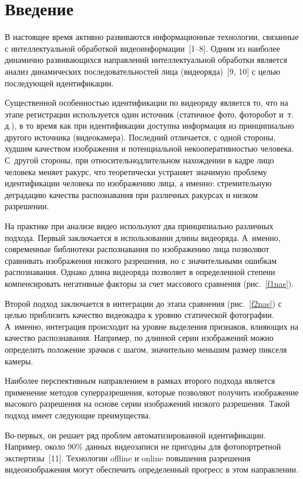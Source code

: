       \begin{multicols}{2}

      \label{st\stat}


     \section{Введение}

     В настоящее время активно развиваются информационные технологии, связанные
с интеллектуальной обработкой видеоинформации~[1--8]. Одним из наиболее
динамично развивающихся\linebreak
на\-прав\-ле\-ний интеллектуальной обработки является анализ
динамических последовательностей лица (видеоряда)~[9, 10] с целью последующей
идентификации.

     Существенной особенностью идентификации по видеоряду является то, что на
этапе регистрации используется один источник (статичное фото, фоторобот и~т.\,д.), в
то время как при идентифи\-кации доступна информация из принципиально другого\linebreak
источника (видеокамера). Последний отличается, с одной стороны, худшим качеством
изоб\-ра\-же\-ния и потенциальной некооперативностью человека. С~другой стороны, при
относительно\linebreak длительном нахождении в кадре лицо человека меняет ракурс, что
теоретически устраняет значимую проблему идентификации человека по изображению
лица, а именно: стремительную деградацию качества распознавания при различных
ракурсах и низком разрешении.

     На практике при анализе видео используют два принципиально различных
подхода. Первый заключается в использовании длины видеоряда. А~именно,
современные библиотеки распознавания по изоб\-ра\-же\-нию лица позволяют сравнивать
изображения низкого разрешения, но с значительными ошибкам распознавания.
Однако длина видеоряда позволяет в определенной степени компенсировать
негативные факторы за счет массового сравнения (рис.~\ref{f1nas}).


      Второй подход заключается в интеграции до этапа сравнения (рис.~\ref{f2nas}) с
целью приблизить качество видеокадра к уровню статической фотографии. А~именно,
интеграция происходит на уровне выделения признаков, влияющих на качество
распознавания. Например, по длинной серии изоб\-ра\-же\-ний можно определить
положение зрачков с шагом, значительно меньшим размер пикселя камеры.


Наиболее перспективным направлением в рамках второго подхода является
применение методов суперразрешения, которые позволяют получить изображение
высокого разрешения на основе серии  изображений низкого разрешения. Такой подход
имеет следующие преимущества. 

Во-первых, он решает ряд проблем
автоматизированной идентификации. Например, около 90\% данных видеозаписи не
пригодны для фотопортретной экспертизы~[11]. Технологии offline и online повышения
разрешения
 видеоизображения могут обеспечить определенный прогресс в этом
на\-прав\-ле\-нии. 

\end{multicols}

